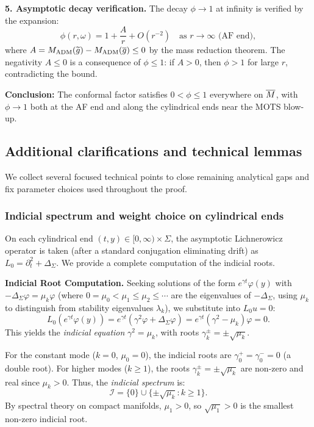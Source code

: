 \begin{remark}
\textbf{5. Asymptotic decay verification.} The decay $\phi \to 1$ at infinity is verified by the expansion:
\begin{equation}
    \phi(r, \omega) = 1 + \frac{A}{r} + O(r^{-2}) \quad \text{as } r \to \infty \text{ (AF end)},
\end{equation}
where $A = M_{\text{ADM}}(\widetilde{g}) - M_{\text{ADM}}(\overline{g}) \le 0$ by the mass reduction theorem. The negativity $A \le 0$ is a consequence of $\phi \le 1$: if $A > 0$, then $\phi > 1$ for large $r$, contradicting the bound.

\textbf{Conclusion:} The conformal factor satisfies $0 < \phi \le 1$ everywhere on $\overline{M}$, with $\phi \to 1$ both at the AF end and along the cylindrical ends near the MOTS blow-up.
\end{remark}

\subsection{Additional clarifications and technical lemmas}

We collect several focused technical points to close remaining analytical gaps and fix parameter choices used throughout the proof.

\subsubsection{Indicial spectrum and weight choice on cylindrical ends}
On each cylindrical end $(t,y)\in[0,\infty)\times\Sigma$, the asymptotic Lichnerowicz operator is taken (after a standard conjugation eliminating drift) as $L_0=\partial_t^2+\Delta_\Sigma$. We provide a complete computation of the indicial roots.

\textbf{Indicial Root Computation.} Seeking solutions of the form $e^{\gamma t}\varphi(y)$ with $-\Delta_\Sigma\varphi=\mu_k\varphi$ (where $0 = \mu_0 < \mu_1 \le \mu_2 \le \cdots$ are the eigenvalues of $-\Delta_\Sigma$, using $\mu_k$ to distinguish from stability eigenvalues $\lambda_k$), we substitute into $L_0 u = 0$:
\[
    L_0(e^{\gamma t}\varphi(y)) = e^{\gamma t}(\gamma^2 \varphi + \Delta_\Sigma \varphi) = e^{\gamma t}(\gamma^2 - \mu_k)\varphi = 0.
\]
This yields the \emph{indicial equation} $\gamma^2 = \mu_k$, with roots $\gamma_k^\pm = \pm\sqrt{\mu_k}$.

For the constant mode ($k=0$, $\mu_0 = 0$), the indicial roots are $\gamma_0^+ = \gamma_0^- = 0$ (a double root). For higher modes ($k \ge 1$), the roots $\gamma_k^\pm = \pm\sqrt{\mu_k}$ are non-zero and real since $\mu_k > 0$. Thus, the \emph{indicial spectrum} is:
\[
    \mathcal{I} = \{0\} \cup \{\pm\sqrt{\mu_k} : k \ge 1\}.
\]
By spectral theory on compact manifolds, $\mu_1 > 0$, so $\sqrt{\mu_1} > 0$ is the smallest non-zero indicial root.

